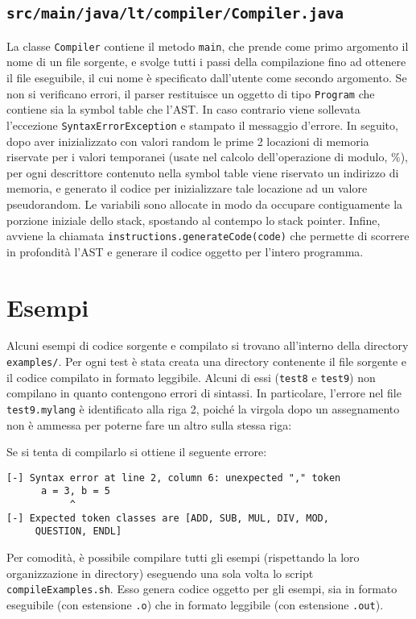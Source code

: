 \documentclass[hidelinks,10pt,a4paper]{article}
\begin{document}
\subsection{\texttt{src/main/java/lt/compiler/Compiler.java}}
La classe \texttt{Compiler} contiene il metodo \texttt{main}, che prende come primo argomento il nome di un file sorgente, e svolge tutti i passi della compilazione fino ad ottenere il file eseguibile, il cui nome è specificato dall'utente come secondo argomento.
Se non si verificano errori, il parser restituisce un oggetto di tipo \texttt{Program} che contiene sia la symbol table che l'AST.
In caso contrario viene sollevata l'eccezione \texttt{SyntaxErrorException} e stampato il messaggio d'errore.
In seguito, dopo aver inizializzato con valori random le prime 2 locazioni di memoria riservate per i valori temporanei (usate nel calcolo dell'operazione di modulo, $\%$), per ogni descrittore contenuto nella symbol table viene riservato un indirizzo di memoria, e generato il codice per inizializzare tale locazione ad un valore pseudorandom.
Le variabili sono allocate in modo da occupare contiguamente la porzione iniziale dello stack, spostando al contempo lo stack pointer.
Infine, avviene la chiamata \texttt{instructions.generateCode(code)} che permette di scorrere in profondità l'AST e generare il codice oggetto per l'intero programma.

\section{Esempi} \label{examples}

Alcuni esempi di codice sorgente e compilato si trovano all'interno della directory \texttt{examples/}.
Per ogni test è stata creata una directory contenente il file sorgente e il codice compilato in formato leggibile.
Alcuni di essi (\texttt{test8} e \texttt{test9}) non compilano in quanto contengono errori di sintassi.
In particolare, l'errore nel file \texttt{test9.mylang} è identificato alla riga 2, poiché la virgola dopo un assegnamento non è ammessa per poterne fare un altro sulla stessa riga:

\lstset{numbers=left, numberstyle=\small, numbersep=8pt, frame=leftline, xleftmargin=20pt}
\lstset{basicstyle=\ttfamily, breaklines=true, showlines=true}


Se si tenta di compilarlo si ottiene il seguente errore:\vspace{1pt}
\begin{verbatim}
[-] Syntax error at line 2, column 6: unexpected "," token
      a = 3, b = 5
           ^
[-] Expected token classes are [ADD, SUB, MUL, DIV, MOD,
     QUESTION, ENDL]
\end{verbatim}
\vspace{4pt}

Per comodità, è possibile compilare tutti gli esempi (rispettando la loro organizzazione in directory) eseguendo una sola volta lo script \texttt{compileExamples.sh}.
Esso genera codice oggetto per gli esempi, sia in formato eseguibile (con estensione \texttt{.o}) che in formato leggibile (con estensione \texttt{.out}).
\end{document}
